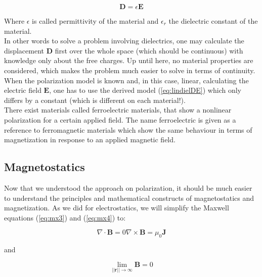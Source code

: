 \begin{equation}\label{eq:lindielDE}
\textbf{D} =\epsilon \textbf{E}
\end{equation}

Where $\epsilon$ is called permittivity of the material and $\epsilon_r$ the dielectric constant of the material.\\

In other words to solve a problem involving dielectrics, one may calculate the displacement $\textbf{D}$ first over the whole space (which should be continuous) with knowledge only about the free charges. Up until here, no material properties are considered, which makes the problem much easier to solve in terms of continuity. \\

When the polarization model is known and, in this case, linear, calculating the electric field $\textbf{E}$, one has to use the derived model (\ref{eq:lindielDE}) which only differs by a constant (which is different on each material!).\\

There exist materials called ferroelectric materials, that show a nonlinear polarization for a certain applied field. The name ferroelectric is given as a reference to ferromagnetic materials which show the same behaviour in terms of magnetization in response to an applied magnetic field. \\

\subsection{Magnetostatics}

Now that we understood the approach on polarization, it should be much easier to understand the principles and mathematical constructs of magnetostatics and magnetization. As we did for electrostatics, we will simplify the Maxwell equations (\ref{eq:mx3}) and (\ref{eq:mx4}) to:

\begin{subequations}
\begin{equation}\label{eq:mx3st}
\nabla \cdot \textbf{B} = 0
\end{equation}
\begin{equation}\label{eq:mx4st}
\nabla \times \textbf{B} = \mu_0\textbf{J}
\end{equation}
\end{subequations}

and

\begin{equation}\label{eq:mx34stbc}
\lim_{||\textbf{r}||  \rightarrow \infty} \textbf{B} =0
\end{equation}


